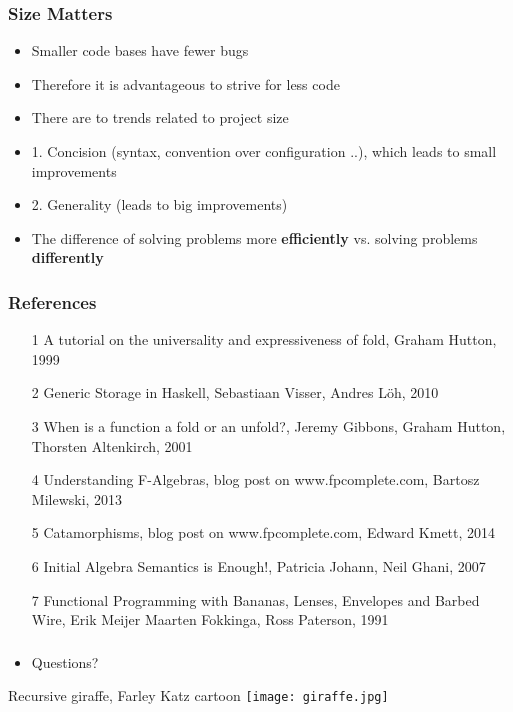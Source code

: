 \documentclass[10pt]{beamer}
\begin{document}
\begin{frame}[fragile]
\frametitle{Size Matters}

\begin{itemize}
\item Smaller code bases have fewer bugs
\item Therefore it is advantageous to strive for less code
\item There are to trends related to project size	
\item 1. Concision (syntax, convention over configuration ..), which leads to small improvements
\item 2. Generality (leads to big improvements) 
\item The difference of solving problems more \textbf{efficiently} vs. solving problems \textbf{differently}   
\end{itemize}

\end{frame}





\begin{frame}[fragile]
\frametitle{References}

\begin{itemize}
\item [1] A tutorial on the universality and expressiveness of fold, Graham Hutton, 1999
\item [2] Generic Storage in Haskell, Sebastiaan Visser, Andres Löh, 2010
\item [3] When is a function a fold or an unfold?, Jeremy Gibbons, Graham Hutton, Thorsten Altenkirch, 2001
\item [4] Understanding F-Algebras, blog post on www.fpcomplete.com, Bartosz Milewski, 2013
\item [5] Catamorphisms, blog post on www.fpcomplete.com, Edward Kmett, 2014
\item [6] Initial Algebra Semantics is Enough!, Patricia Johann, Neil Ghani, 2007
\item [7] Functional Programming with Bananas, Lenses, Envelopes and Barbed Wire, Erik Meijer Maarten Fokkinga, Ross Paterson, 1991
\end{itemize}

\end{frame}




\begin{frame}[fragile]
\frametitle{}

\begin{itemize}
\item Questions?
\end{itemize}

\begin{block}{Recursive giraffe, Farley Katz cartoon }
\texttt{[image: giraffe.jpg]}	
\end{block}
\end{frame}
\end{document}
